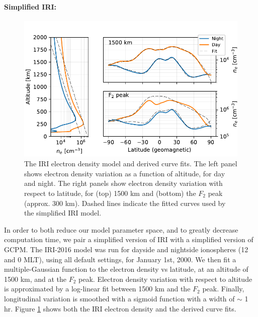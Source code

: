 \paragraph{Simplified IRI:}
\begin{figure}[h]
\begin{center}
\includegraphics{figures/iono_profile.pdf}
\caption[Ionosphere density profile]{The IRI electron density model and derived curve fits. The left panel shows electron density variation as a function of altitude, for day and night. The right panels show electron density variation with respect to latitude, for (top) 1500 km and (bottom) the $F_2$ peak (approx. 300 km). Dashed lines indicate the fitted curves used by the simplified IRI model.}
\label{fig:iono_profile}
\end{center}
\end{figure}

In order to both reduce our model parameter space, and to greatly decrease computation time, we pair a simplified version of IRI with a simplified version of GCPM. The IRI-2016 model was run for dayside and nightside ionospheres (12 and 0 MLT), using all default settings, for January 1st, 2000. We then fit a multiple-Gaussian function to the electron density vs latitude, at an altitude of 1500 km, and at the $F_2$ peak. Electron density variation with respect to altitude is approximated by a log-linear fit between 1500 km and the $F_2$ peak. Finally, longitudinal variation is smoothed with a sigmoid function with a width of $\sim$ 1 hr. Figure \ref{fig:iono_profile} shows both the IRI electron density and the derived curve fits.
